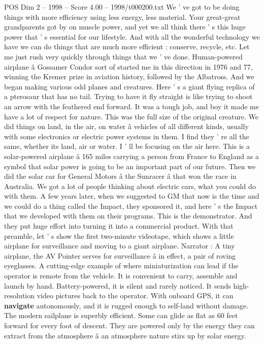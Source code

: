 \begin{textsample}{POS Dim 2 – 1998 – Score 4.00 – 1998/t000200.txt}
We ' ve got to be doing things with more efficiency using less energy, less material.
Your great-great grandparents got by on muscle power, and yet we all think there ' s this huge power that ' s essential for our lifestyle.
And with all the wonderful technology we have we can do things that are much more efficient : conserve, recycle, etc.
Let me just rush very quickly through things that we ' ve done.
Human-powered airplane â Gossamer Condor sort of started me in this direction in 1976 and 77, winning the Kremer prize in aviation history, followed by the Albatross.
And we began making various odd planes and creatures.
Here ' s a giant flying replica of a pterosaur that has no tail.
Trying to have it fly straight is like trying to shoot an arrow with the feathered end forward.
It was a tough job, and boy it made me have a lot of respect for nature.
This was the full size of the original creature.
We did things on land, in the air, on water â vehicles of all different kinds, usually with some electronics or electric power systems in them.
I find they ' re all the same, whether its land, air or water.
I ' ll be focusing on the air here.
This is a solar-powered airplane â 165 miles carrying a person from France to England as a symbol that solar power is going to be an important part of our future.
Then we did the solar car for General Motors â the Sunracer â that won the race in Australia.
We got a lot of people thinking about electric cars, what you could do with them.
A few years later, when we suggested to GM that now is the time and we could do a thing called the Impact, they sponsored it, and here ' s the Impact that we developed with them on their programs.
This is the demonstrator.
And they put huge effort into turning it into a commercial product.
With that preamble, let ' s show the first two-minute videotape, which shows a little airplane for surveillance and moving to a giant airplane.
Narrator : A tiny airplane, the AV Pointer serves for surveillance â in effect, a pair of roving eyeglasses.
A cutting-edge example of where miniaturization can lead if the operator is remote from the vehicle.
It is convenient to carry, assemble and launch by hand.
Battery-powered, it is silent and rarely noticed.
It sends high-resolution video pictures back to the operator.
With onboard GPS, it can \textbf{navigate} autonomously, and it is rugged enough to self-land without damage.
The modern sailplane is superbly efficient.
Some can glide as flat as 60 feet forward for every foot of descent.
They are powered only by the energy they can extract from the atmosphere â an atmosphere nature stirs up by solar energy.

\end{textsample}
